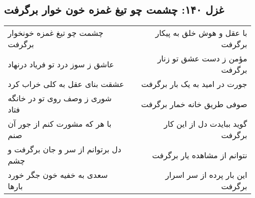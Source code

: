 \begin{center}
\section*{غزل ۱۴۰: چشمت چو تیغ غمزه خون خوار برگرفت}
\label{sec:140}
\begin{longtable}{l p{0.5cm} r}
چشمت چو تیغ غمزه خونخوار برگرفت
&&
با عقل و هوش خلق به پیکار برگرفت
\\
عاشق ز سوز درد تو فریاد درنهاد
&&
مؤمن ز دست عشق تو زنار برگرفت
\\
عشقت بنای عقل به کلی خراب کرد
&&
جورت در امید به یک بار برگرفت
\\
شوری ز وصف روی تو در خانگه فتاد
&&
صوفی طریق خانه خمار برگرفت
\\
با هر که مشورت کنم از جور آن صنم
&&
گوید ببایدت دل از این کار برگرفت
\\
دل برتوانم از سر و جان برگرفت و چشم
&&
نتوانم از مشاهده یار برگرفت
\\
سعدی به خفیه خون جگر خورد بارها
&&
این بار پرده از سر اسرار برگرفت
\\
\end{longtable}
\end{center}
